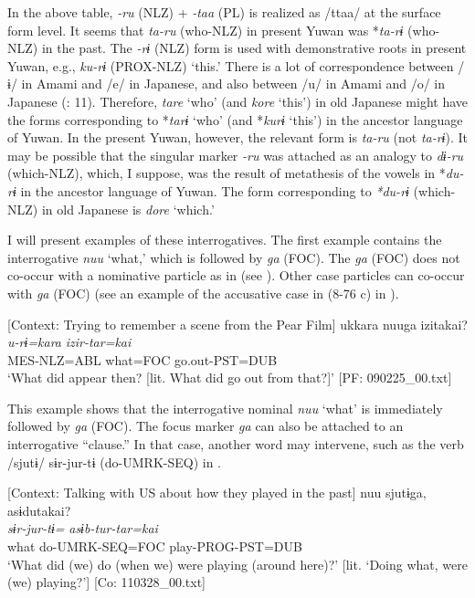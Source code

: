 In the above table, \textit{{}-ru} (NLZ) + \textit{{}-taa} (PL) is realized as /ttaa/ at the surface form level. It seems that \textit{ta-ru} (who-NLZ) in present Yuwan was *\textit{ta-rɨ} (who-NLZ) in the past. The \textit{{}-rɨ} (NLZ) form is used with demonstrative roots in present Yuwan, e.g., \textit{ku-rɨ} (PROX-NLZ) ‘this.’ There is a lot of correspondence between /ɨ/ in Amami and /e/ in Japanese, and also between /u/ in Amami and /o/ in Japanese (\citealt{HirayamaEtAl1966}: 11). Therefore, \textit{tare} ‘who’ (and \textit{kore} ‘this’) in old Japanese might have the forms corresponding to *\textit{tarɨ} ‘who’ (and *\textit{kurɨ} ‘this’) in the ancestor language of Yuwan. In the present Yuwan, however, the relevant form is \textit{ta-ru} (not \textit{ta-rɨ}). It may be possible that the singular marker \textit{-ru} was attached as an analogy to \textit{dɨ-ru} (which-NLZ), which, I suppose, was the result of metathesis of the vowels in *\textit{du-rɨ} in the ancestor language of Yuwan. The form corresponding to \textit{*du-rɨ} (which-NLZ) in old Japanese is \textit{dore} ‘which.’

  I will present examples of these interrogatives. The first example contains the interrogative \textit{nuu} ‘what,’ which is followed by \textit{ga} (FOC). The \textit{ga} (FOC) does not co-occur with a nominative particle as in  (see ). Other case particles can co-occur with \textit{ga} (FOC) (see an example of the accusative case in (8-76 c) in ).

\ea \label{ex:5:31}   [Context: Trying to remember a scene from the Pear Film]
\glll  ukkara  nuuga  izitakai?\\
\textit{u-rɨ=kara}  \textit{}  \textit{izir-tar=kai}\\
MES-NLZ=ABL  what=FOC  go.out-PST=DUB\\
\glt ‘What did appear then? [lit. What did go out from that?]’ [PF: 090225\_00.txt]
\z

This example shows that the interrogative nominal \textit{nuu} ‘what’ is immediately followed by \textit{ga} (FOC). The focus marker \textit{ga} can also be attached to an interrogative “clause.” In that case, another word may intervene, such as the verb /sjutɨ/ sɨr-jur-tɨ (do-UMRK-SEQ) in .

\ea \label{ex:5:32}   [Context: Talking with US about how they played in the past]
\glll  nuu  sjutɨga,  asɨdutakai?\\
\textit{}  \textit{sɨr-jur-tɨ=}  \textit{asɨb-tur-tar=kai}\\
what  do-UMRK-SEQ=FOC  play-PROG-PST=DUB\\
\glt ‘What did (we) do (when we) were playing (around here)?’ [lit. ‘Doing what, were (we) playing?’] [Co: 110328\_00.txt]
\z

